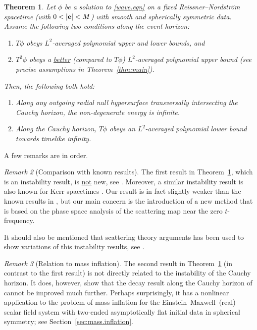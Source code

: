 \documentclass[10pt, reqno]{amsart}
\newtheorem{theorem}{Theorem}[section]
\theoremstyle{definition}
\theoremstyle{remark}
\newtheorem{remark}[theorem]{Remark}
\numberwithin{equation}{section}
\newcommand{\0}{\emptyset}
\begin{document}
\begin{theorem}\label{thm:main.intro}
Let $\phi$ be a solution to \eqref{wave.eqn} on a fixed Reissner--Nordstr\"om spacetime (with $0<|{\bf e}|<M$) with smooth and spherically symmetric data.
Assume the following two conditions along the event horizon:
\begin{enumerate}
\item $T\phi$ obeys $L^2$-averaged polynomial upper and lower bounds, and
\item $T^2\phi$ obeys a \underline{better} (compared to $T\phi$) $L^2$-averaged polynomial upper bound (see precise assumptions in Theorem~\ref{thm:main}).
\end{enumerate}
Then, the following both hold:
\begin{enumerate}
\item Along any outgoing radial null hypersurface transversally intersecting the Cauchy horizon, the non-degenerate energy is infinite.
\item Along the Cauchy horizon, $T\phi$ obeys an $L^2$-averaged polynomial lower bound towards timelike infinity. %
\end{enumerate}
\end{theorem}


A few remarks are in order.

\begin{remark}[Comparison with known results]
The first result in Theorem~\ref{thm:main.intro}, which is an instability result, is \underline{not} new, see \cite{D2,LO.instab}. Moreover, a similar instability result is also known for Kerr spacetimes \cite{LS}. Our result is in fact slightly weaker than the known results in \cite{LO.instab, LS}, but our main concern is the introduction of a new method that is based on the phase space analysis of the scattering map near the zero $t$-frequency.

It should also be mentioned that scattering theory arguments has been used to show variations of this instability results, see \cite{CH, DafShl, KSR, McN}.
\end{remark}

\begin{remark}[Relation to mass inflation]
The second result in Theorem~\ref{thm:main.intro} (in contrast to the first result) is not directly related to the instability of the Cauchy horizon. It does, however, show that the decay result along the Cauchy horizon of \cite{Hintz} cannot be improved much further. Perhaps surprisingly, it has a nonlinear application to the problem of mass inflation for the Einstein--Maxwell--(real) scalar field system with two-ended asymptotically flat initial data in spherical symmetry; see Section~\ref{sec:mass.inflation}.
\end{remark}
\end{document}
